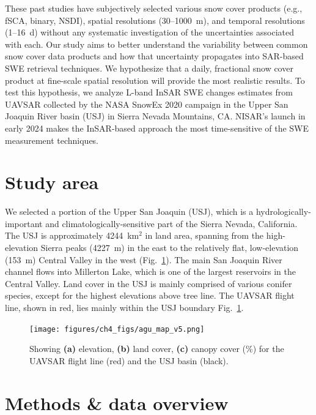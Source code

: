 These past studies have subjectively selected various snow cover products (e.g., fSCA, binary, NSDI), spatial resolutions (30--1000~m), and temporal resolutions (1--16~d) without any systematic investigation of the uncertainties associated with each. Our study aims to better understand the variability between common snow cover data products and how that uncertainty propagates into SAR-based SWE retrieval techniques. We hypothesize that a daily, fractional snow cover product at fine-scale spatial resolution will provide the most realistic results. To test this hypothesis, we analyze L-band InSAR SWE changes estimates from UAVSAR collected by the NASA SnowEx 2020 \citep{marshallNASASnowEx20202019} campaign in the Upper San Joaquin River basin (USJ) in Sierra Nevada Mountains, CA. NISAR's launch in early 2024 makes the InSAR-based approach the most time-sensitive of the SWE measurement techniques.


\hypertarget{ch4-methods}{\section{Study area}\label{ch4-methods}}

We selected a portion of the Upper San Joaquin (USJ), which is a hydrologically-important and climatologically-sensitive part of the Sierra Nevada, California. The USJ is approximately 4244~km$^{2}$ in land area, spanning from the high-elevation Sierra peaks (4227~m) in the east to the relatively flat, low-elevation (153~m) Central Valley in the west (Fig.~\ref{fig:multisensor_study_area}). The main San Joaquin River channel flows into Millerton Lake, which is one of the largest reservoirs in the Central Valley. Land cover in the USJ is mainly comprised of various conifer species, except for the highest elevations above tree line. The UAVSAR flight line, shown in red, lies mainly within the USJ boundary Fig.~\ref{fig:multisensor_study_area}.

\begin{figure}[ht]
\texttt{[image: figures/ch4\_figs/agu\_map\_v5.png]}
\centering
\caption{Showing \textbf{(a)} elevation, \textbf{(b)} land cover, \textbf{(c)} canopy cover (\%) for the UAVSAR flight line (red) and the USJ basin (black).}
\label{fig:multisensor_study_area}
\end{figure}

\hypertarget{ch4-methods}{\section{Methods \& data overview}\label{ch4-methods}}

